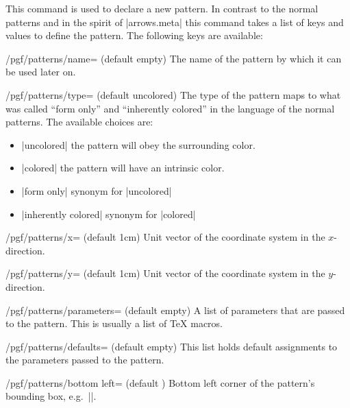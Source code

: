 \begin{command}{\pgfdeclarepattern{}}
    This command is used to declare a new pattern.  In contrast to the normal
    patterns and in the spirit of |arrows.meta| this command takes a list of
    keys and values to define the pattern.  The following keys are available:
\begin{key}{/pgf/patterns/name= (default empty)}
    The name of the pattern by which it can be used later on.
\end{key}
\begin{key}{/pgf/patterns/type= (default uncolored)}
    The type of the pattern maps to what was called ``form only'' and ``inherently colored'' in the language of the normal patterns.
    The available choices are:
    \begin{itemize}
    \item |uncolored| the pattern will obey the surrounding color.
    \item |colored| the pattern will have an intrinsic color.
    \item |form only| synonym for |uncolored|
    \item |inherently colored| synonym for |colored|
    \end{itemize}
\end{key}
\begin{key}{/pgf/patterns/x= (default 1cm)}
    Unit vector of the coordinate system in the $x$-direction.
\end{key}
\begin{key}{/pgf/patterns/y= (default 1cm)}
    Unit vector of the coordinate system in the $y$-direction.
\end{key}
\begin{key}{/pgf/patterns/parameters= (default empty)}
    A list of parameters that are passed to the pattern.  This is usually a
    list of TeX macros.
\end{key}
\begin{key}{/pgf/patterns/defaults= (default empty)}
    This list holds default assignments to the parameters passed to the
    pattern.
\end{key}
\begin{key}{/pgf/patterns/bottom left= (default \string\pgfpointorigin)}
    Bottom left corner of the pattern's bounding box, e.g.\
    |\pgfqpoint{-.1pt}{-.1pt}|.
\end{key}

\end{command}
